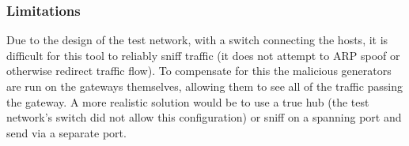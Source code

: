 \subsubsection{Limitations}
\par Due to the design of the test network, with a switch connecting the hosts, it is difficult for this tool to reliably sniff traffic (it does not attempt to \ac{ARP} spoof or otherwise redirect traffic flow). To compensate for this the malicious generators are run on the gateways themselves, allowing them to see all of the traffic passing the gateway. A more realistic solution would be to use a true hub (the test network's switch did not allow this configuration) or sniff on a spanning port and send via a separate port.

